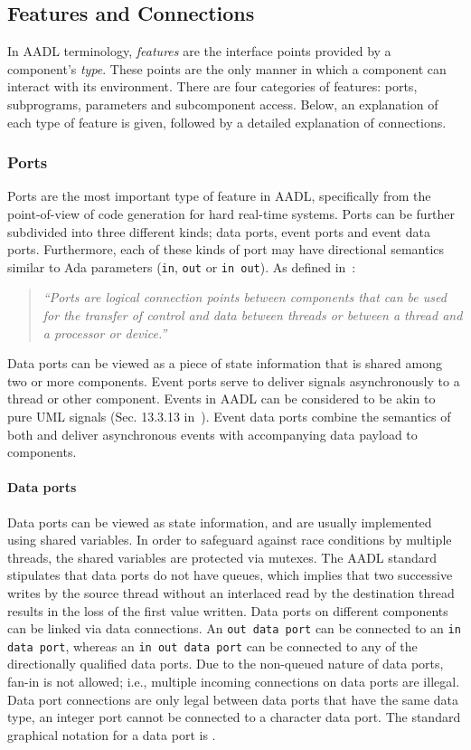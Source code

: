 \subsection{Features and Connections}
In AADL terminology, \emph{features} are the interface points provided
by a component's \emph{type}. These points are the only manner in
which a component can interact with its environment. There are four
categories of features: ports, subprograms, parameters and
subcomponent access. Below, an explanation of each type of feature is
given, followed by a detailed explanation of connections.

\subsubsection{Ports}
Ports are the most important type of feature in AADL, specifically
from the point-of-view of code generation for hard real-time
systems. Ports can be further subdivided into three different kinds;
data ports, event ports and event data ports. Furthermore, each of
these kinds of port may have directional semantics similar to Ada
parameters (\texttt{in}, \texttt{out} or \texttt{in out}). As defined
in~\cite{AS5506}:

\begin{quote}
\emph{``Ports are logical connection points between components that
  can be used for the transfer of control and data between threads or
  between a thread and a processor or device.''}
\end{quote}

Data ports can be viewed as a piece of state information that is
shared among two or more components. Event ports serve to deliver
signals asynchronously to a thread or other component. Events in AADL
can be considered to be akin to pure UML signals (Sec. 13.3.13
in~\cite{uml-super}). Event data ports combine the semantics of both
and deliver asynchronous events with accompanying data payload to
components.

\paragraph{Data ports} Data ports can be viewed as state
information, and are usually implemented using shared variables. In
order to safeguard against race conditions by multiple threads, the
shared variables are protected via mutexes. The AADL standard
stipulates that data ports do not have queues, which implies that two
successive writes by the source thread without an interlaced read by
the destination thread results in the loss of the first value
written. Data ports on different components can be linked via data
connections. An \texttt{out data port} can be connected to an
\texttt{in data port}, whereas an \texttt{in out data port} can be
connected to any of the directionally qualified data ports. Due to the
non-queued nature of data ports, fan-in is not allowed; i.e., multiple
incoming connections on data ports are illegal. Data port
connections are only legal between data ports that have the same data
type, an integer port cannot be connected to a character data
port. The standard graphical notation for a data port is \dataport.

